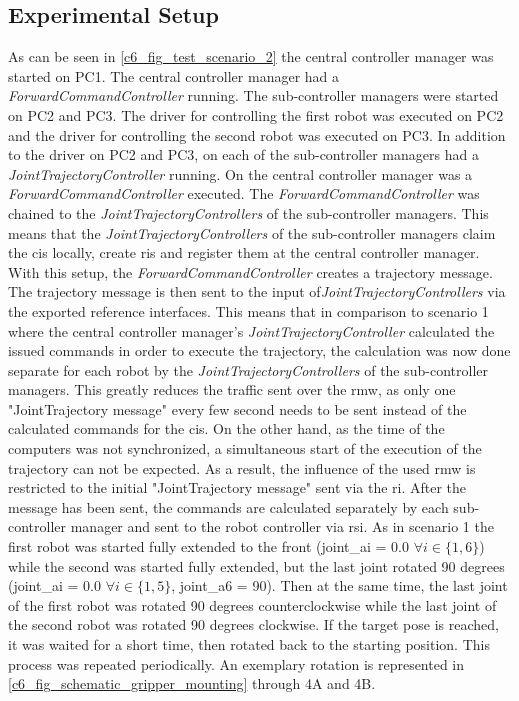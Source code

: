 \subsection{Experimental Setup}
As can be seen in \autoref{c6_fig_test_scenario_2} the central controller manager was started on PC1. The central controller manager had a \textit{ForwardCommandController} running. The sub-controller managers were started on PC2 and PC3. The driver for controlling the first robot was executed on PC2 and the driver for controlling the second robot was executed on PC3. In addition to the driver on PC2 and PC3, on each of the sub-controller managers had a \textit{JointTrajectoryController} running. On the central controller manager was a \textit{ForwardCommandController} executed. The \textit{ForwardCommandController} was chained to the \textit{JointTrajectoryControllers} of the sub-controller managers. This means that the \textit{JointTrajectoryControllers} of the sub-controller managers claim the \glspl{ci} locally, create \glspl{ri} and register them at the central controller manager. With this setup, the \textit{ForwardCommandController} creates a trajectory message. The trajectory message is then sent to the input of\textit{JointTrajectoryControllers} via the exported reference interfaces. This means that in comparison to scenario 1 where the central controller manager's \textit{JointTrajectoryController} calculated the issued commands in order to execute the trajectory, the calculation was now done separate for each robot by the \textit{JointTrajectoryControllers} of the sub-controller managers. This greatly reduces the traffic sent over the \gls{rmw}, as only one "JointTrajectory message" every few second needs to be sent instead of the calculated commands for the \glspl{ci}. On the other hand, as the time of the computers was not synchronized, a simultaneous start of the execution of the trajectory can not be expected. As a result, the influence of the used \gls{rmw} is restricted to the initial "JointTrajectory message" sent via the \gls{ri}. After the message has been sent, the commands are calculated separately by each sub-controller manager and sent to the robot controller via \gls{rsi}. \newline
As in scenario 1 the first robot was started fully extended to the front (joint\_ai = 0.0 $\forall i\in\{1,6\}$) while the second was started fully extended, but the last joint rotated 90 degrees (joint\_ai = 0.0 $\forall i\in\{1,5\}$, joint\_a6 = 90). Then at the same time, the last joint of the first robot was rotated 90 degrees counterclockwise while the last joint of the second robot was rotated 90 degrees clockwise. If the target pose is reached, it was waited for a short time, then rotated back to the starting position. This process was repeated periodically. An exemplary rotation is represented in \autoref{c6_fig_schematic_gripper_mounting} through 4A and 4B.\newline

